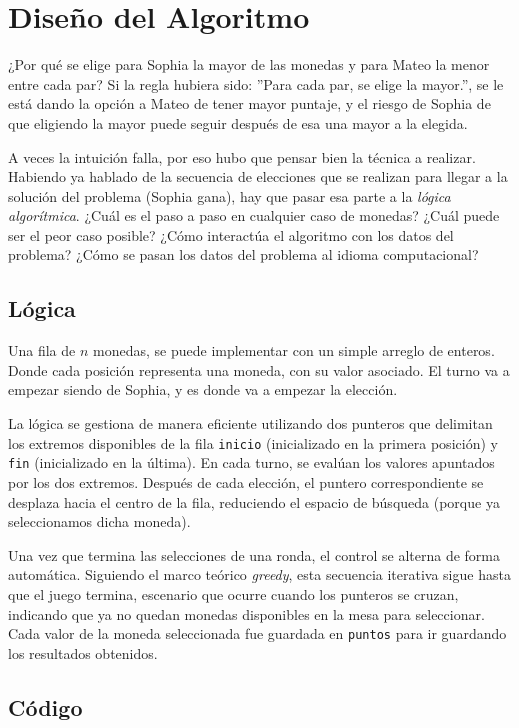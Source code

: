 \section{Diseño del Algoritmo}
¿Por qué se elige para Sophia la mayor de las monedas y para Mateo la menor entre cada par?
Si la regla hubiera sido: ''Para cada par, se elige la mayor.'', se le está dando la opción a Mateo de tener mayor puntaje, y el riesgo de Sophia de que eligiendo la mayor puede seguir después de esa una mayor a la elegida.

A veces la intuición falla, por eso hubo que pensar bien la técnica a realizar. Habiendo ya hablado de la secuencia de elecciones que se realizan para llegar a la solución del problema (Sophia gana), hay que pasar esa parte a la \textit{lógica algorítmica}. ¿Cuál es el paso a paso en cualquier caso de monedas? ¿Cuál puede ser el peor caso posible? ¿Cómo interactúa el algoritmo con los datos del problema? ¿Cómo se pasan los datos del problema al idioma computacional?

\subsection{Lógica}

Una fila de $n$ monedas, se puede implementar con un simple arreglo de enteros. Donde cada posición representa una moneda, con su valor asociado.
El turno va a empezar siendo de Sophia, y es donde va a empezar la elección. 

La lógica se gestiona de manera eficiente utilizando dos punteros que delimitan los extremos disponibles de la fila  \texttt{inicio} (inicializado en la primera posición) y \texttt{fin} (inicializado en la última). En cada turno, se evalúan los valores apuntados por los dos extremos. Después de cada elección, el puntero correspondiente se desplaza hacia el centro de la fila, reduciendo el espacio de búsqueda (porque ya seleccionamos dicha moneda).

Una vez que termina las selecciones de una ronda, el control se alterna de forma automática. Siguiendo el marco teórico \textit{greedy}, esta secuencia iterativa sigue hasta que el juego termina, escenario que ocurre cuando los punteros se cruzan, indicando que ya no quedan monedas disponibles en la mesa para seleccionar. Cada valor de la moneda seleccionada fue guardada en \texttt{puntos} para ir guardando los resultados obtenidos.




\subsection{Código}\label{rec:codigo} %

